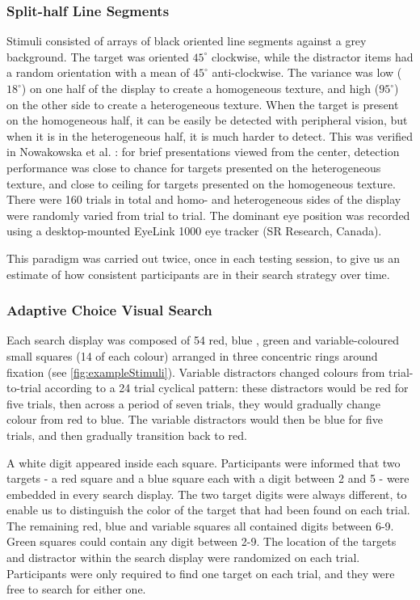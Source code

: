 \documentclass[Afour, sageapa, times]{sagej}
\begin{document}
\subsubsection{Split-half Line Segments}

Stimuli consisted of arrays of black oriented line segments against a grey background. The target was oriented $45^{\circ}$ clockwise, while the distractor items had a random orientation with a mean of $45^{\circ}$ anti-clockwise. The variance was low ($18^{\circ}$) on one half of the display to create a homogeneous texture, and high ($95^{\circ}$) on the other side to create a heterogeneous texture. When the target is present on the homogeneous half, it can be easily be detected with peripheral vision, but when it is in the heterogeneous half, it is much harder to detect. This was verified in Nowakowska et al. \citeyear{nowakowska2017}: for brief presentations viewed from the center, detection performance was close to chance for targets presented on the heterogeneous texture, and close to ceiling for targets presented on the homogeneous texture. There were 160 trials in total and homo- and heterogeneous sides of the display were randomly varied from trial to trial. The dominant eye position was recorded using a desktop-mounted EyeLink 1000 eye tracker (SR Research, Canada). 

This paradigm was carried out twice, once in each testing session, to give us an estimate of how consistent participants are in their search strategy over time. 

\subsubsection{Adaptive Choice Visual Search}

Each search display was composed of 54 red, blue , green and variable-coloured small squares (14 of each colour) arranged in three concentric rings around fixation (see \ref{fig:exampleStimuli}). Variable distractors changed colours from trial-to-trial according to a 24 trial cyclical pattern: these distractors would be red for five trials, then across a period of seven trials, they would gradually change colour from red to blue. The variable distractors would then be blue for five trials, and then gradually transition back to red. 
 
A white digit appeared inside each square. Participants were informed that two targets - a red square and a blue square each with a digit between 2 and 5 - were embedded in every search display. The two target digits were always different, to enable us to distinguish the color of the target that had been found on each trial. The remaining red, blue and variable squares all contained digits between 6-9. Green squares could contain any digit between 2-9. The location of the targets and distractor within the search display were randomized on each trial. Participants were only required to find one target on each trial, and they were free to search for either one.   
\end{document}
